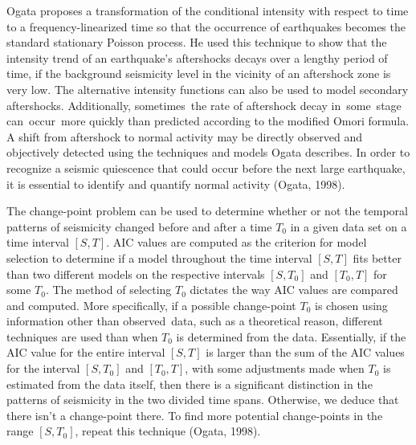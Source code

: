 \documentclass[12pt]{article} %
\theoremstyle{plain}
\begin{document}
	
	
	Ogata proposes a transformation of the conditional intensity with respect to time to a frequency-linearized time so that the occurrence of earthquakes becomes the standard stationary Poisson process. He used this technique to show that the intensity trend of an earthquake's aftershocks decays over a lengthy period of time, if the background seismicity level in the vicinity of an aftershock zone is very low. The alternative intensity functions can also be used to model secondary aftershocks. Additionally, sometimes the rate of aftershock decay in some stage can occur more quickly than predicted according to the modified Omori formula. A shift from aftershock to normal activity may be directly observed and objectively detected using the techniques and models Ogata describes. In order to recognize a seismic quiescence that could occur before the next large earthquake, it is essential to identify and quantify normal activity (Ogata, 1998).
	
	The change-point problem can be used to determine whether or not the temporal patterns of seismicity changed before and after a time $T_0$ in a given data set on a time interval $[S, T]$. AIC values are computed as the criterion for model selection to determine if a model throughout the time interval $[S, T]$ fits better than two different models on the respective intervals $[S, T_0]$ and $[T_0, T]$ for some $T_0$. The method of selecting $T_0$ dictates the way AIC values are compared and computed. More specifically, if a possible change-point $T_0$ is chosen using information other than observed data, such as a theoretical reason, different techniques are used than when $T_0$ is determined from the data. Essentially, if the AIC value for the entire interval $[S,T]$ is larger than the sum of the AIC values for the interval $[S,T_0]$ and $[T_0,T]$, with some adjustments made when $T_0$ is estimated from the data itself, then there is a significant distinction in the patterns of seismicity in the two divided time spans. Otherwise, we deduce that there isn't a change-point there. To find more potential change-points in the range $[S, T_0]$, repeat this technique (Ogata, 1998).
	
\end{document}
